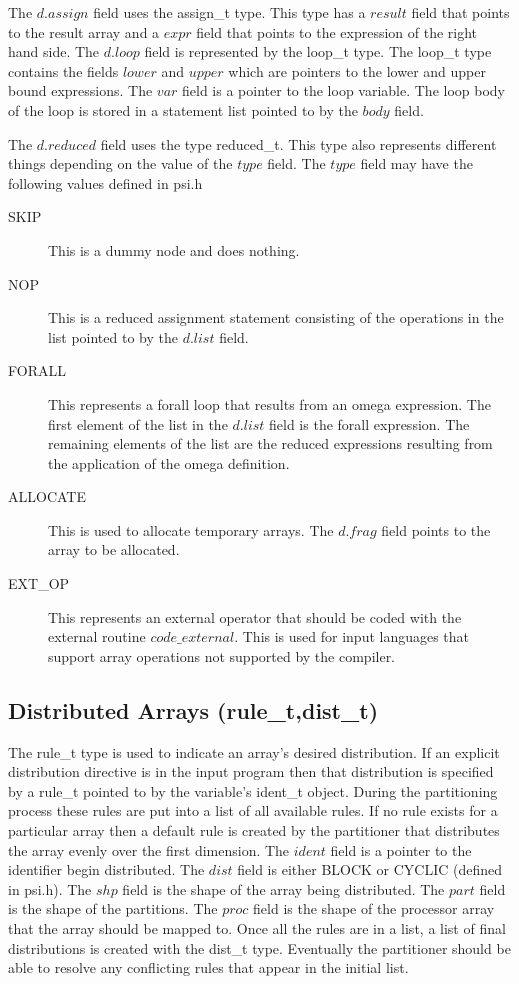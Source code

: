 The $d.assign$ field uses the assign\_t type.  This type has a $result$
field that points to the result array and a $expr$ field that points to
the expression of the right hand side.  The $d.loop$ field is represented
by the loop\_t type.  The loop\_t type contains the fields $lower$ and
$upper$ which are pointers to the lower and upper bound expressions.  The
$var$ field is a pointer to the loop variable.  The loop body of the
loop is stored in a statement list pointed to by the $body$ field.

The $d.reduced$ field uses the type reduced\_t.  This type also represents
different things depending on the value of the $type$ field.  The $type$
field may have the following values defined in psi.h
\begin{description}
\item[SKIP]  This is a dummy node and does nothing.
\item[NOP] This is a reduced assignment statement consisting of the operations
in the list pointed to by the $d.list$ field.
\item[FORALL]  This represents a forall loop that results from an omega
expression.  The first element of the list in the $d.list$ field is the
forall expression.  The remaining elements of the list are the reduced
expressions resulting from the application of the omega definition.
\item[ALLOCATE]  This is used to allocate temporary arrays.  The $d.frag$
field points to the array to be allocated.
\item[EXT\_OP]  This represents an external operator that should be coded with
the external routine $code\_external$.  This is used for input languages that
support array operations not supported by the compiler.
\end{description}

\subsection{Distributed Arrays (rule\_t,dist\_t)}
The rule\_t type is used to indicate an array's desired distribution.  If
an explicit distribution directive is in the input program then that 
distribution is specified by a rule\_t pointed to by the variable's
ident\_t object.  During the partitioning process these rules are put into
a list of all available rules.  If no rule exists for a particular array
then a default rule is created by the partitioner that distributes the 
array evenly over the first dimension.  The $ident$ field is a pointer
to the identifier begin distributed.  The $dist$ field is either BLOCK
or CYCLIC (defined in psi.h).  The $shp$ field is the shape of the
array being distributed.  The $part$ field is the shape of the partitions.
The $proc$ field is the shape of the processor array that the array should
be mapped to.  Once all the rules are in
a list, a list of final distributions is created with the dist\_t type.
Eventually the partitioner should be able to resolve any conflicting rules
that appear in the initial list.

